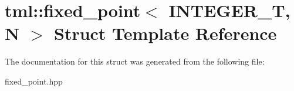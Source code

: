 \hypertarget{structtml_1_1fixed__point}{\section{tml\+:\+:fixed\+\_\+point$<$ I\+N\+T\+E\+G\+E\+R\+\_\+\+T, N $>$ Struct Template Reference}
\label{structtml_1_1fixed__point}
}


The documentation for this struct was generated from the following file\+:\begin{DoxyCompactItemize}
\item 
fixed\+\_\+point.\+hpp\end{DoxyCompactItemize}
